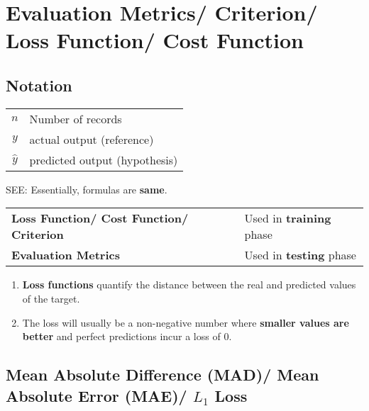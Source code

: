 \chapter{Evaluation Metrics/ Criterion/ Loss Function/ Cost Function}

\section*{Notation}
\begin{customTableWrapper}{1.3}
\begin{table}[H]
    \begin{tabular}{ c l }
        $n$  & Number of records \\ 
        $y$ & actual output (reference) \\ 
        $\hat{y}$ & predicted output (hypothesis) \\ 
    \end{tabular}
\end{table}
\end{customTableWrapper}

SEE: 
Essentially, formulas are \textbf{same}.

\begin{table}[h]
    \begin{tabular}{l l}
        \textbf{Loss Function/ Cost Function/ Criterion} & Used in \textbf{training} phase \\
        
        \textbf{Evaluation Metrics} & Used in \textbf{testing} phase \\
    \end{tabular}
\end{table}


\begin{enumerate}
    \item \textbf{Loss functions} quantify the distance between the real and predicted values of the target. 
    
    \item The loss will usually be a non-negative number where \textbf{smaller values are better} and perfect predictions incur a loss of $0$.

\end{enumerate}

\section{Mean Absolute Difference (MAD)/ Mean Absolute Error (MAE)/ $L_1$ Loss}\label{Mean Absolute Difference (MAD)}\label{Mean Absolute Error (MAE)}\label{L1 Loss}

